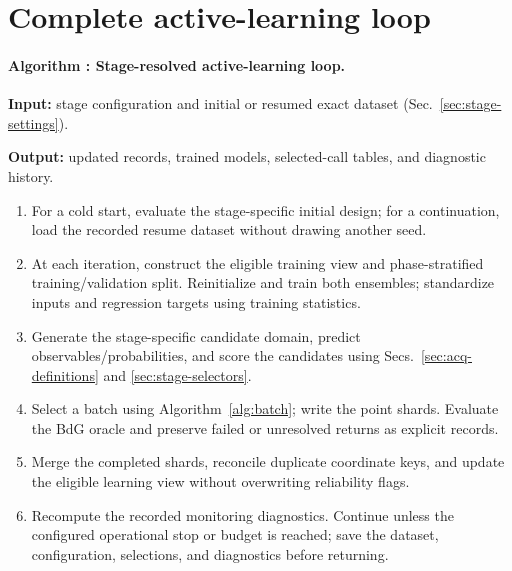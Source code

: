 \section{Complete active-learning loop}
\noindent\begin{minipage}{\textwidth}
\label{alg:loop}\paragraph{Algorithm \thealgorithm: Stage-resolved active-learning loop.}
\textbf{Input:} stage configuration and initial or resumed exact dataset (Sec.~\ref{sec:stage-settings}).\par\textbf{Output:} updated records, trained models, selected-call tables, and diagnostic history.
\begin{enumerate}
\item For a cold start, evaluate the stage-specific initial design; for a continuation, load the recorded resume dataset without drawing another seed.
\item At each iteration, construct the eligible training view and phase-stratified training/validation split. Reinitialize and train both ensembles; standardize inputs and regression targets using training statistics.
\item Generate the stage-specific candidate domain, predict observables/probabilities, and score the candidates using Secs.~\ref{sec:acq-definitions} and \ref{sec:stage-selectors}.
\item Select a batch using Algorithm~\ref{alg:batch}; write the point shards. Evaluate the BdG oracle and preserve failed or unresolved returns as explicit records.
\item Merge the completed shards, reconcile duplicate coordinate keys, and update the eligible learning view without overwriting reliability flags.
\item Recompute the recorded monitoring diagnostics. Continue unless the configured operational stop or budget is reached; save the dataset, configuration, selections, and diagnostics before returning.
\end{enumerate}
\end{minipage}\par


